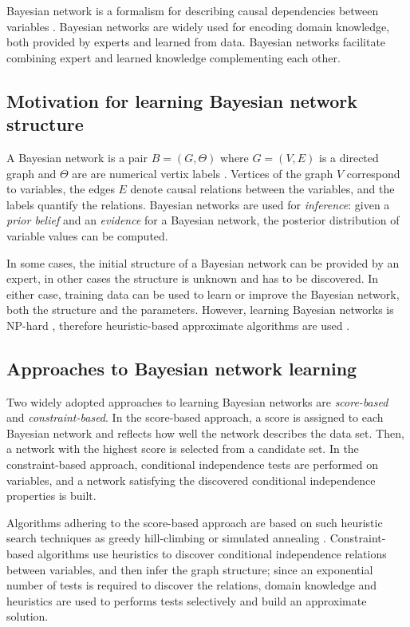 Bayesian network is a formalism for describing causal dependencies
between variables \cite{Pearl.PRIS}. Bayesian networks are widely used
for encoding domain knowledge, both provided by experts and learned
from data.  Bayesian networks facilitate combining expert and learned
knowledge complementing each other.

\subsection{Motivation for learning Bayesian network structure}

A Bayesian network is a pair $B=(G, \Theta)$ where $G=(V,E)$ is a directed
graph and $\Theta$ are are numerical vertix labels
\cite{Heckerman.tutorial}. Vertices of the graph $V$ correspond to variables,
the edges $E$ denote causal relations between the variables, and the labels
quantify the relations. Bayesian networks are used for {\it
inference}: given a {\it prior belief} and an {\it evidence} for a
Bayesian network, the posterior distribution of variable values can be
computed.

In some cases, the initial structure of a Bayesian network can be
provided by an expert, in other cases the structure is unknown and
has to be discovered. In either case, training data can be used
to learn or improve the Bayesian network, both the structure and the
parameters. However, learning Bayesian networks is NP-hard 
\cite{Chickering.learningbayesian}, therefore heuristic-based
approximate algorithms are used \cite{Heckerman.tutorial}.

\subsection{Approaches to Bayesian network learning}

Two widely adopted approaches to learning Bayesian networks are {\it
  score-based} and {\it constraint-based}. In the score-based
approach, a score is assigned to each Bayesian network and reflects
how well the network describes the data set. Then, a network with
the highest score is selected from a candidate set. In the
constraint-based approach, conditional independence tests are
performed on variables, and a network satisfying the discovered
conditional independence properties is built. 

Algorithms adhering to the score-based approach are based on 
such heuristic search techniques as greedy hill-climbing or
simulated annealing \cite{Heckerman.tutorial}. Constraint-based
algorithms use heuristics to discover conditional independence
relations between variables, and then infer the graph structure; since
an exponential number of tests is required to discover the relations,
domain knowledge and heuristics are used to performs tests selectively
and build an approximate solution.

